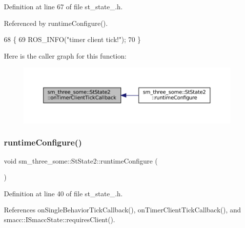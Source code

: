Definition at line 67 of file st\+\_\+state\+\_.\+h.



Referenced by runtime\+Configure().


\begin{DoxyCode}
68     \{
69         ROS\_INFO(\textcolor{stringliteral}{"timer client tick!"});
70     \}
\end{DoxyCode}
Here is the caller graph for this function\+:
\nopagebreak
\begin{figure}[H]
\begin{center}
\leavevmode
\includegraphics[width=350pt]{structsm__three__some_1_1StState2_a489156949b0f8f08fc7e32850154ded8_icgraph}
\end{center}
\end{figure}
\mbox{\label{structsm__three__some_1_1StState2_aab0c27caa0d5a70c644ee1ec0830ba15}} 
\subsubsection{\texorpdfstring{runtime\+Configure()}{runtimeConfigure()}}
{\footnotesize\ttfamily void sm\+\_\+three\+\_\+some\+::\+St\+State2\+::runtime\+Configure (\begin{DoxyParamCaption}{ }\end{DoxyParamCaption})\hspace{0.3cm}{\ttfamily [inline]}}



Definition at line 40 of file st\+\_\+state\+\_.\+h.



References on\+Single\+Behavior\+Tick\+Callback(), on\+Timer\+Client\+Tick\+Callback(), and smacc\+::\+I\+Smacc\+State\+::requires\+Client().


